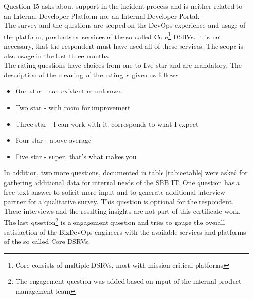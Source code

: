 \documentclass[a4paper,12pt]{article}
\begin{document}
    Question 15 asks about support in the incident process and is neither related to an Internal Developer Platform
    nor an Internal Developer Portal. \\
    The survey and the questions are scoped on the DevOps experience and usage of the platform, products or services of
    the so called Core\footnote{Core consists of multiple DSRVs, most with mission-critical platforms} DSRVs.
    It is not necessary, that the respondent must have used all of these services.
    The scope is also usage in the last three months.\\
    The rating questions have choices from one to five star and are mandatory.
    The description of the meaning of the rating is given as follows
    \begin{itemize}
        \item One star - non-existent or unknown
        \item Two star - with room for improvement
        \item Three star - I can work with it, corresponds to what I expect
        \item Four star - above average
        \item Five star - super, that's what makes you
    \end{itemize}

    In addition, two more questions, documented in table \ref{tab:oetable} were asked for gathering additional data for
    internal needs of the SBB IT.
    One question has a free text answer to solicit more input and to generate additional interview partner
    for a qualitative survey.
    This question is optional for the respondent.
    These interviews and the resulting insights are not part of this certificate work.
    The last question\footnote{The engagement question was added based on input of the internal product management team}
    is a engagement question and tries to gauge the overall satisfaction of the BizDevOps engineers
    with the available services and platforms of the so called Core DSRVs.
\end{document}
